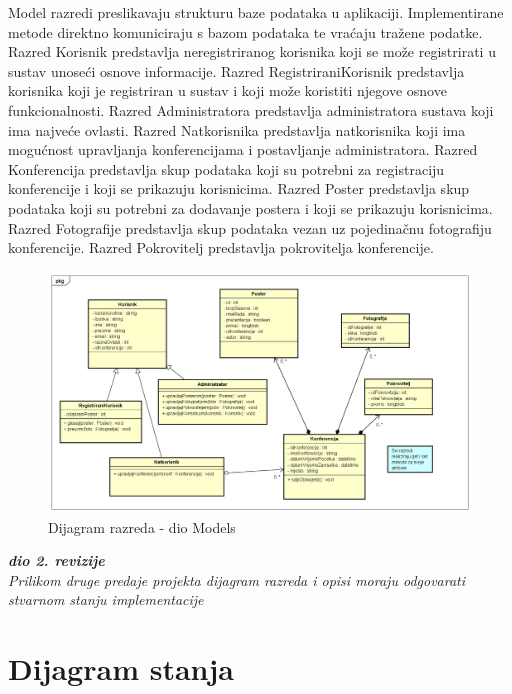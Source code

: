 			Model razredi preslikavaju strukturu baze podataka u aplikaciji. Implementirane metode direktno komuniciraju s bazom podataka te vraćaju tražene podatke. Razred Korisnik predstavlja neregistriranog korisnika koji se može registrirati u sustav unoseći osnove informacije. Razred RegistriraniKorisnik predstavlja korisnika koji je registriran u sustav i koji može koristiti njegove osnove funkcionalnosti. Razred Administratora predstavlja administratora sustava koji ima najveće ovlasti. Razred Natkorisnika predstavlja natkorisnika koji ima mogućnost upravljanja konferencijama i postavljanje administratora. Razred Konferencija predstavlja skup podataka koji su potrebni za registraciju konferencije i koji se prikazuju korisnicima. Razred Poster predstavlja skup podataka koji su potrebni za dodavanje postera i koji se prikazuju korisnicima. Razred Fotografije predstavlja skup podataka vezan uz pojedinačnu fotografiju konferencije. Razred Pokrovitelj predstavlja pokrovitelja konferencije. 
			
			\begin{figure} [h]
				\includegraphics[width=\linewidth]{Slike/ClassDiagram}
				\caption{Dijagram razreda - dio Models}
			\end{figure}
			
			\textbf{\textit{dio 2. revizije}}\\			
			
			\textit{Prilikom druge predaje projekta dijagram razreda i opisi moraju odgovarati stvarnom stanju implementacije}
			
			
			
			\eject
		
		\section{Dijagram stanja}
			
